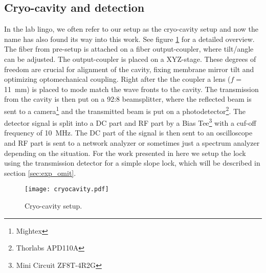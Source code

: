 \subsection{Cryo-cavity and detection}
In the lab lingo, we often refer to our setup as the cryo-cavity setup and now the name has also found its way into this work. See figure \ref{fig:cryocavity} for a detailed overview. The fiber from pre-setup is attached on a fiber output-coupler, where tilt/angle can be adjusted. The output-coupler is placed on a XYZ-stage. These degrees of freedom are crucial for alignment of the cavity, fixing membrane mirror tilt and optimizing optomechanical coupling. Right after the the coupler a lens ($f = $\SI{11}{\milli\meter}) is placed to mode match the wave fronts to the cavity. The transmission from the cavity is then put on a 92:8 beamsplitter, where the reflected beam is sent to a camera\footnote{Mightex} and the transmitted beam is put on a photodetector\footnote{Thorlabs APD110A}. The detector signal is split into a DC part and RF part by a Bias Tee\footnote{Mini Circuit ZF8T-4R2G} with a cuf-off frequency of \SI{10}{\mega\hertz}. The DC part of the signal is then sent to an oscilloscope and RF part is sent to a network analyzer or sometimes just a spectrum analyzer depending on the situation. For the work presented in here we setup the lock using the transmission detector for a simple slope lock, which will be described in section \ref{sec:exp_omit}.

\begin{figure}[H]
\centering
\texttt{[image: cryocavity.pdf]}
\caption{Cryo-cavity setup.}
\label{fig:cryocavity}
\end{figure}